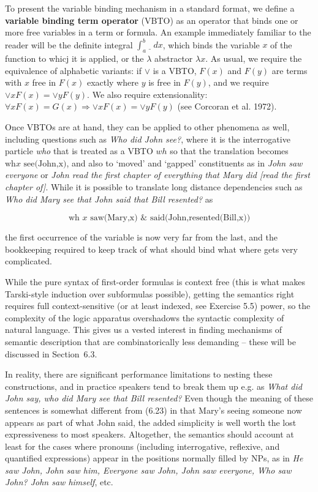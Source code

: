 To present the variable binding mechanism in a standard format, we define a
{\bf variable binding term operator} (VBTO)
as an operator that binds one or more free variables
in a term or formula. An example immediately familiar to the reader will be
the definite integral $\int_a^b \underline{\ \ }\ dx$, which binds the
variable $x$ of the function to whicj it is applied, or the $\lambda$
abstractor $\lambda x$. As usual, we require the equivalence of alphabetic
variants: if $\vee$ is a VBTO, $F(x)$ and $F(y)$ are terms with $x$ free in
$F(x)$ exactly where $y$ is free in $F(y)$, and we require $\vee x F(x)= \vee
y F(y)$. We also require extensionality: $\forall x F(x)=G(x) \Rightarrow \vee
x F(x)= \vee y F(y)$ (see Corcoran et al. 1972).\nocite{Corcoran:1972}

Once VBTOs are at hand, they can be applied to other phenomena as well,
including questions such as {\it Who did John see?}, where it is the
interrogative particle {\it who} that is treated as a VBTO $wh$ so that the
translation becomes $\text{wh} x \text{ see(John,x)}$, and also to `moved' and
`gapped' constituents as in {\it John saw everyone} or {\it John read the
  first chapter of everything that Mary did [read the first chapter
    of]}. While it is possible to translate long distance dependencies such as
{\it Who did Mary see that John said that Bill resented?} as

\begin{equation}
\text{wh } x \text{ saw(Mary,x) } \& \text{ said(John,resented(Bill,x))}
\end{equation}

\smallskip\noindent the first occurrence of the variable is now very far from
the last, and the bookkeeping required to keep track of what should bind what
where gets very complicated. 

While the pure syntax of first-order formulas is context free (this is what
makes Tarski-style induction over subformulas possible), getting the semantics
right requires full context-sensitive (or at least indexed, see Exercise 5.5)
power, so the complexity of the logic apparatus overshadows the syntactic
complexity of natural language. This gives us a vested interest in finding
mechanisms of semantic description that are combinatorically less demanding --
these will be discussed in Section~6.3.

In reality, there are significant performance limitations to nesting these
constructions, and in practice speakers tend to break them up e.g. as {\it
  What did John say, who did Mary see that Bill resented?} Even though the
meaning of these sentences is somewhat different from (6.23) in that Mary's
seeing someone now appears as part of what John said, the added simplicity is
well worth the lost expressiveness to most speakers. Altogether, the semantics
should account at least for the cases where pronouns (including interrogative,
reflexive, and quantified expressions) appear in the positions normally filled
by NPs, as in {\it He saw John, John saw him, Everyone saw John, John saw
  everyone, Who saw John? John saw himself}, etc.

